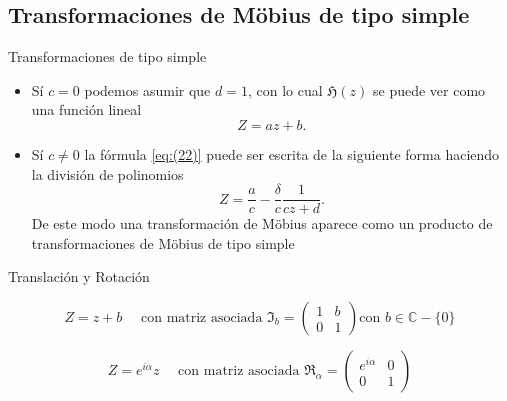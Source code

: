 \documentclass{beamer}
\newenvironment{Teorema}[1]{
  \begin{tcolorbox}[colback=blockbackground,colframe=ritsumeikan,title=#1]
}{
  \end{tcolorbox}
}
\begin{document}
\subsection{Transformaciones de Möbius de tipo simple}

\begin{frame}{Transformaciones de tipo simple}
    \begin{itemize}
        \item Sí $c=0$ podemos asumir que $d=1$, con lo cual $\mathfrak{H}(z)$ se puede ver como una función lineal
        \begin{equation*}
            Z=az+b.
        \end{equation*}
        \item Sí $c\neq0$ la fórmula \eqref{eq:(22)} puede ser escrita de la siguiente forma haciendo la división de polinomios
        \begin{equation}
            Z = \frac{a}{c}-\frac{\delta}{c}\frac{1}{cz+d}. 
            \label{eq:(29)}
        \end{equation}
        De este modo una transformación de Möbius aparece como un producto de transformaciones de Möbius de tipo simple
    \end{itemize}
\end{frame}
\begin{frame}{Translación y Rotación}
    \begin{Teorema}{Translación}
        \begin{equation}
            Z=z+b \quad \text{ con matriz asociada } \mathfrak{I}_b=\begin{pmatrix}
                1 & b\\
                0 & 1
            \end{pmatrix}
            \text{con } b\in \mathbb{C}-\{0\}
            \label{eq:(30)}
        \end{equation}
    \end{Teorema}
    \begin{Teorema}{Rotación}
        \begin{equation}
            Z=e^{i\alpha}z \quad \text{ con matriz asociada }\mathfrak{R}_\alpha =
            \begin{pmatrix}
                e^{i\alpha} & 0\\
                0 & 1
            \end{pmatrix}
            \label{eq:(31)}
        \end{equation}
    \end{Teorema}
\end{frame}
\end{document}

